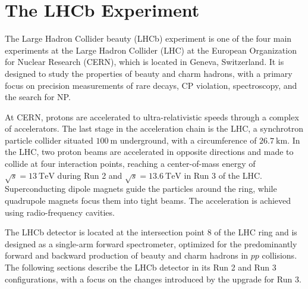 \chapter{The LHCb Experiment}
\label{ch:lhcb}

The Large Hadron Collider beauty (LHCb) experiment \cite{lhcb2008, lhcb2015} is one of the four main experiments at the Large Hadron Collider (LHC) \cite{lhc_machine2008} at the European Organization for Nuclear Research (CERN), which is located in Geneva, Switzerland. It is designed to study the properties of beauty and charm hadrons, with a primary focus on precision measurements of rare decays, CP violation, spectroscopy, and the search for NP.

At CERN, protons are accelerated to ultra-relativistic speeds through a complex of accelerators. The last stage in the acceleration chain is the LHC, a synchrotron particle collider situated $\qty{100}{\meter}$ underground, with a circumference of $\qty{26.7}{\kilo\meter}$. In the LHC, two proton beams are accelerated in opposite directions and made to collide at four interaction points, reaching a center-of-mass energy of $\sqrt{s} =  \qty{13}{\tera\electronvolt}$ during Run 2 and $\sqrt{s} = \qty{13.6}{\tera\electronvolt}$ in Run 3 of the LHC. Superconducting dipole magnets guide the particles around the ring, while quadrupole magnets focus them into tight beams. The acceleration is achieved using radio-frequency cavities.

The LHCb detector is located at the intersection point 8 of the LHC ring and is designed as a single-arm forward spectrometer, optimized for the predominantly forward and backward production of beauty and charm hadrons in $pp$ collisions. The following sections describe the LHCb detector in its Run 2 and Run 3 configurations, with a focus on the changes introduced by the upgrade for Run 3.

